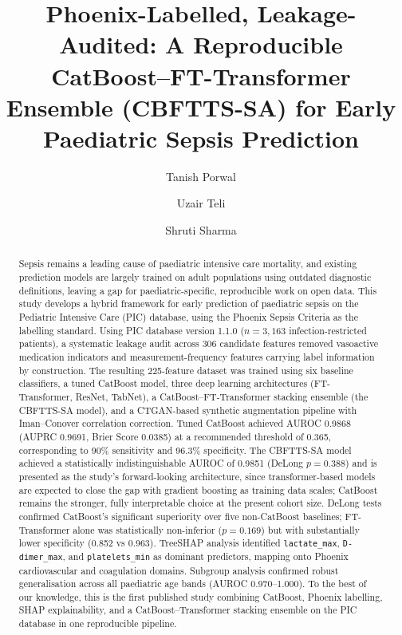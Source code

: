 \documentclass[final,3p,times]{elsarticle}
\begin{document}
\begin{frontmatter}

\title{Phoenix-Labelled, Leakage-Audited: A Reproducible CatBoost–FT-Transformer Ensemble (CBFTTS-SA) for Early Paediatric Sepsis Prediction}

\author[1]{Tanish Porwal}
\author[1]{Uzair Teli}
\author[1]{Shruti Sharma}




\begin{abstract}
Sepsis remains a leading cause of paediatric intensive care mortality, and existing prediction models are largely trained on adult populations using outdated diagnostic definitions, leaving a gap for paediatric-specific, reproducible work on open data. This study develops a hybrid framework for early prediction of paediatric sepsis on the Pediatric Intensive Care (PIC) database, using the Phoenix Sepsis Criteria as the labelling standard. Using PIC database version 1.1.0 ($n = 3{,}163$ infection-restricted patients), a systematic leakage audit across 306 candidate features removed vasoactive medication indicators and measurement-frequency features carrying label information by construction. The resulting 225-feature dataset was trained using six baseline classifiers, a tuned CatBoost model, three deep learning architectures (FT-Transformer, ResNet, TabNet), a CatBoost--FT-Transformer stacking ensemble (the CBFTTS-SA model), and a CTGAN-based synthetic augmentation pipeline with Iman--Conover correlation correction. Tuned CatBoost achieved AUROC 0.9868 (AUPRC 0.9691, Brier Score 0.0385) at a recommended threshold of 0.365, corresponding to 90\% sensitivity and 96.3\% specificity. The CBFTTS-SA model achieved a statistically indistinguishable AUROC of 0.9851 (DeLong $p = 0.388$) and is presented as the study's forward-looking architecture, since transformer-based models are expected to close the gap with gradient boosting as training data scales; CatBoost remains the stronger, fully interpretable choice at the present cohort size. DeLong tests confirmed CatBoost's significant superiority over five non-CatBoost baselines; FT-Transformer alone was statistically non-inferior ($p = 0.169$) but with substantially lower specificity (0.852 vs 0.963). TreeSHAP analysis identified \texttt{lactate\_max}, \texttt{D-dimer\_max}, and \texttt{platelets\_min} as dominant predictors, mapping onto Phoenix cardiovascular and coagulation domains. Subgroup analysis confirmed robust generalisation across all paediatric age bands (AUROC 0.970--1.000). To the best of our knowledge, this is the first published study combining CatBoost, Phoenix labelling, SHAP explainability, and a CatBoost--Transformer stacking ensemble on the PIC database in one reproducible pipeline.
\end{abstract}


\end{frontmatter}
\end{document}
